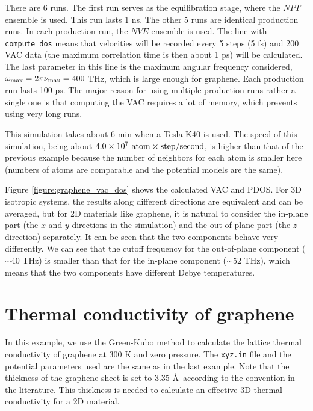 \documentclass[12pt,a4paper]{report}
\begin{document}
There are 6 runs. The first run serves as the equilibration stage, where the $NPT$ ensemble is used. This run lasts 1 ns. The other 5 runs are identical production runs. In each production run, the $NVE$ ensemble is used. The line with \verb"compute_dos" means that velocities will be recorded every 5 steps (5 fs) and 200 VAC data (the maximum correlation time is then about 1 ps) will be calculated. The last parameter in this line is the maximum angular frequency considered, $\omega_{\rm max} = 2\pi\nu_{\rm max} =400$ THz, which is large enough for graphene. Each production run lasts 100 ps. The major reason for using multiple production runs rather a single one is that computing the VAC requires a lot of memory, which prevents using very long runs.

This simulation takes about 6 min when a Tesla K40 is used.
The speed of this simulation, being about $4.0\times 10^7 ~\textmd{atom} \times \textmd{step} / \textmd{second}$, is higher than that of the previous example because the number of neighbors for each atom is smaller here (numbers of atoms are comparable and the potential models are the same).



Figure \ref{figure:graphene_vac_dos} shows the calculated VAC and PDOS.
For 3D isotropic systems, the results along different directions are equivalent and can be averaged, but for 2D materials like graphene, it is natural to consider the in-plane part (the $x$ and $y$ directions in the simulation) and the out-of-plane part (the $z$ direction) separately. It can be seen that the two components behave very differently. We can see that the cutoff frequency for the out-of-plane component ($\sim 40$ THz) is smaller than that for the in-plane component ($\sim 52$ THz), which means that the two components have different Debye temperatures.


\section{Thermal conductivity of graphene}


In this example, we use the Green-Kubo method to calculate the lattice thermal conductivity of graphene at 300 K and zero pressure. The \verb"xyz.in" file and the potential parameters used are the same as in the last example. Note that the thickness of the graphene sheet is set to 3.35 \AA ~according to the convention in the literature. This thickness is needed to calculate an effective 3D thermal conductivity for a 2D material.
\end{document}
